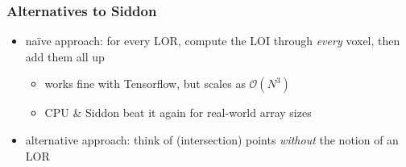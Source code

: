 \documentclass{beamer}
\begin{document}
\begin{frame}
  \frametitle{Alternatives to Siddon}
  \begin{itemize}
    \item na\"ive approach: for every LOR, compute the LOI through \textsl{every} voxel, then add them all up
      \begin{itemize}
        \item works fine with Tensorflow, but scales as $\mathcal{O}(N^3)$
        \item CPU \& Siddon beat it again for real-world array sizes
      \end{itemize}
    \pause
    \item alternative approach: think of (intersection) points \textsl{without} the notion of an LOR
  \end{itemize}
  \begin{figure}
    \centering
  \end{figure}
\end{frame}
\end{document}
